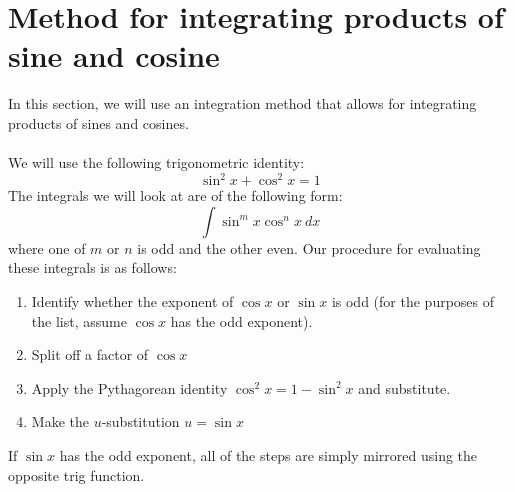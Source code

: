 \documentclass[11pt]{scrartcl}
\begin{document}
\maketitle
\noindent 

\section{Method for integrating products of sine and cosine}
\noindent
In this section, we will use an integration method that allows for integrating products of sines and cosines. \\
\\
\noindent 
We will use the following trigonometric identity: 
$$\sin ^2 x + \cos ^2 x=1$$
\noindent 
The integrals we will look at are of the following form: 
$$\int{\sin ^m x \cos ^n x \ dx}$$
\noindent 
where one of $m$ or $n$ is odd and the other even. Our procedure for evaluating these integrals is as follows: 
\begin{enumerate}
    \item Identify whether the exponent of $\cos x$ or $\sin x$ is odd (for the purposes of the list, assume $\cos x$ has the odd exponent). 
    \item Split off a factor of $\cos x$
    \item Apply the Pythagorean identity $\cos ^2 x = 1-\sin ^2 x$ and substitute. 
    \item Make the $u$-substitution $u=\sin x$
\end{enumerate}
\noindent 
If $\sin x$ has the odd exponent, all of the steps are simply mirrored using the opposite trig function.  
\end{document}
